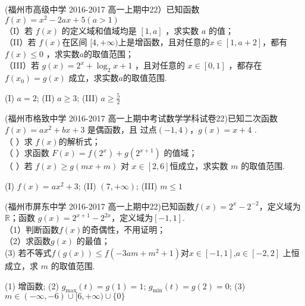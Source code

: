 \item
(福州市高级中学 2016-2017 高一上期中22）已知函数$f(x)=x^2-2ax+5(a>1)$\\
（I）若 $f (x )$ 的定义域和值域均是 $[1, a]$ ，求实数 $a$ 的值； \\
（II）若 $f (x ) $在区间 $[4,+\infty)$上是增函数，且对任意的$ x \in[1, a+ 2]$，都有 $f( x )\leq 0$ ，求实数$a$的取值范围；\\
（III）若 $g( x )=2^x+\log_2{x+ 1 }$ ，且对任意的 $x \in[0,1]$ ，都存在$f(x_0)=g(x)$ 成立，求实数$a$的取值范围.\\
\begin{answer}
(I) $a=2$; (II) $a\geq3$; (III) $a\geq\frac52$
\end{answer}

\item
(福州市格致中学 2016-2017 高一上期中考试数学学科试卷22)已知二次函数 $f ( x )= ax^2+ bx+3$ 是偶函数，且 过点$(-1,4)$，$ g ( x )= x + 4$ .\\
（ ）求 $f (x) $的解析式；\\
（ ）求函数 $F ( x )= f (2^x )+ g (2^{x+1} )$ 的值域； \\
（ ）若 $f ( x ) \geq g ( mx +m )$ 对 $x\in [2, 6] $恒成立，求实数 $m$ 的取值范围.\\
\begin{answer}
(I) $f(x)=ax^2+3$; (II) $(7,+\infty)$; (III) $m\leq1$
\end{answer}

\item
(福州市屏东中学 2016-2017 高一上期中22)已知函数$f(x)=2^x-2^{-2} $，定义域为$\mathbb{R} $；函数 $g(x)=2^{x+1}-2^{2x} $，定义域为$[-1,1] $.\\
（1）判断函数$f(x) $的奇偶性，不用证明；\\
（2）求函数$g(x) $ 的最值；\\
 (3) 若不等式$f(g(x))\leq f(-3am+m^2+1) $对$x\in[-1,1] $,$a\in[-2,2] $ 上恒成立，求 $m$ 的取值范围.\\
 \begin{answer}
 (1) 增函数; (2) $g_{\max}(t)=g(1)=1 $; $g_{\min}(t)=g(2)=0 $; (3) $m\in (-\infty,-6)\cup[6,+\infty)\cup\{0\} $
\end{answer}















